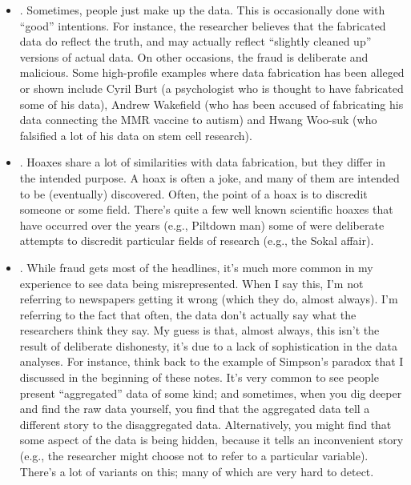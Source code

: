 \begin{itemize}
\item {}. Sometimes, people just make up the data. This is occasionally done with ``good'' intentions. For instance, the researcher believes that the fabricated data do reflect the truth, and may actually reflect ``slightly cleaned up'' versions of actual data. On other occasions, the fraud is deliberate and malicious. Some high-profile examples where data fabrication has been alleged or shown include Cyril Burt (a psychologist who is thought to have fabricated some of his data), Andrew Wakefield (who has been accused of fabricating his data connecting the MMR vaccine to autism) and Hwang Woo-suk (who falsified a lot of his data on stem cell research).  
\item {}. Hoaxes share a lot of similarities with data fabrication, but they differ in the intended purpose. A hoax is often a joke, and many of them are intended to be (eventually) discovered. Often, the point of a hoax is to discredit someone or some field. There's quite a few well known scientific hoaxes that have occurred over the years (e.g., Piltdown man) some of were deliberate attempts to discredit particular fields of research (e.g., the Sokal affair). 
\item {}. While fraud gets most of the headlines, it's much more common in my experience to see data being misrepresented. When I say this, I'm not referring to newspapers getting it wrong (which they do, almost always). I'm referring to the fact that often, the data don't actually say what the researchers think they say. My guess is that, almost always, this isn't the result of deliberate dishonesty, it's due to a lack of sophistication in the data analyses. For instance, think back to the example of Simpson's paradox that I discussed in the beginning of these notes. It's very common to see people present ``aggregated'' data of some kind; and sometimes, when you dig deeper and find the raw data yourself, you find that the aggregated data tell a different story to the disaggregated data. Alternatively, you might find that some aspect of the data is being hidden, because it tells an inconvenient story (e.g., the researcher might choose not to refer to a particular variable). There's a lot of variants on this; many of which are very hard to detect.

\end{itemize}
